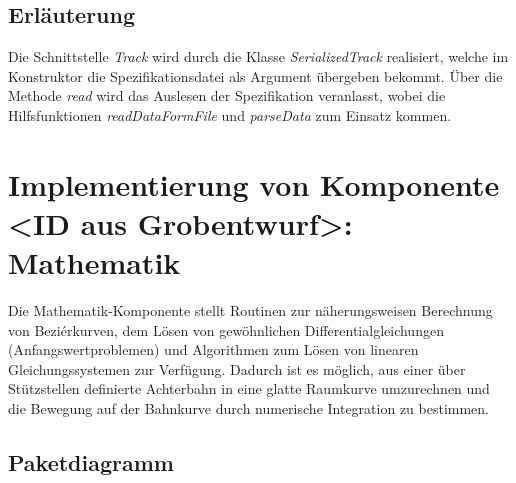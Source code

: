 \subsection{Erläuterung}

Die Schnittstelle \emph{Track} wird durch die Klasse \emph{SerializedTrack} realisiert,
welche im Konstruktor die Spezifikationsdatei als Argument übergeben bekommt. Über
die Methode \emph{read} wird das Auslesen der Spezifikation veranlasst, wobei
die Hilfsfunktionen \emph{readDataFormFile} und \emph{parseData} zum Einsatz kommen.

\section{Implementierung von Komponente
         <ID aus Grobentwurf>: Mathematik}

Die Mathematik-Komponente stellt Routinen zur näherungsweisen Berechnung
von Beziérkurven, dem Lösen von gewöhnlichen Differentialgleichungen 
(Anfangswertproblemen) und Algorithmen zum Lösen von linearen Gleichungssystemen
zur Verfügung. Dadurch ist es möglich, aus einer über Stützstellen definierte 
Achterbahn in eine glatte Raumkurve umzurechnen und die Bewegung auf
der Bahnkurve durch numerische Integration zu bestimmen.

\subsection{Paketdiagramm}

